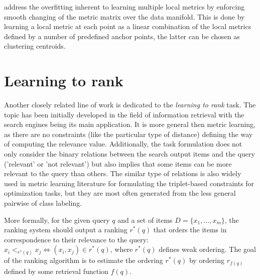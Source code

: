 \citep{NIPS2012_4818} address the overfitting inherent to learning multiple local metrics \citep{weinberger2009distance} by enforcing smooth changing of the metric matrix over the data manifold. This is done by learning a local metric at each point as a linear combination of the local metrics defined by a number of predefined anchor points, the latter can be chosen as clustering centroids.

\section{Learning to rank} %
\label{sec:learning_to_rank}

Another closely related line of work is dedicated to the \textit{learning to rank} task. The topic has been initially developed in the field of information retrieval with the search engines being its main application. 
It is more general then metric learning, as there are no constraints (like the particular type of distance) defining the way of computing the relevance value. Additionally, the task formulation does not only consider the binary relations between the search output items and the query ('relevant' or 'not relevant') but also implies  that some items can be more relevant to the query than others. The similar type of relations is also widely used in metric learning literature \citep{weinberger2009distance} for formulating the triplet-based constraints for optimization tasks, but they are most often generated from the less general pairwise of class labeling. 

More formally, for the given query $q$ and a set of items $D = \{x_1, ..., x_m\}$, the ranking system should output a ranking $r^*(q)$ that orders the items in correspondence to their relevance to the query: $x_i <_{r^*(q)} x_j \Leftrightarrow (x_i, x_j) \in r^*(q)$, where $r^*(q)$ defines weak ordering. The goal of the ranking algorithm is to estimate the ordering $r^*(q)$ by ordering $r_{f(q)}$ defined by some retrieval function $f(q)$.

